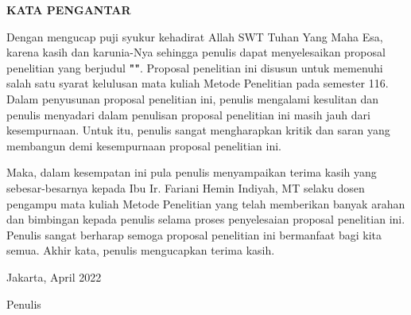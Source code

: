 \clearpage
{}
{}
\begin{center}
	\textbf{\large KATA PENGANTAR}\\[3em]
\end{center}
	
Dengan mengucap puji syukur kehadirat Allah SWT Tuhan Yang Maha Esa, karena kasih dan karunia-Nya sehingga penulis dapat menyelesaikan proposal penelitian yang berjudul \textbf{"\judul"}. Proposal penelitian ini disusun untuk memenuhi salah satu syarat kelulusan mata kuliah Metode Penelitian pada semester 116. Dalam penyusunan proposal penelitian ini, penulis mengalami kesulitan dan penulis menyadari dalam penulisan proposal penelitian ini masih jauh dari kesempurnaan. Untuk itu, penulis sangat mengharapkan kritik dan saran yang membangun demi kesempurnaan proposal penelitian ini.
	
\vspace*{0.5cm}

Maka, dalam kesempatan ini pula penulis menyampaikan terima kasih yang sebesar-besarnya kepada Ibu Ir. Fariani Hemin Indiyah, MT selaku dosen pengampu mata kuliah Metode Penelitian yang telah memberikan banyak arahan dan bimbingan kepada penulis selama proses penyelesaian proposal penelitian ini. Penulis sangat berharap semoga proposal penelitian ini bermanfaat bagi kita semua. Akhir kata, penulis mengucapkan terima kasih.
	
\vspace*{0.5cm}	

\begin{flushright}
		
Jakarta, April 2022\\
	
\vspace*{2cm}
	
Penulis

\end{flushright}
